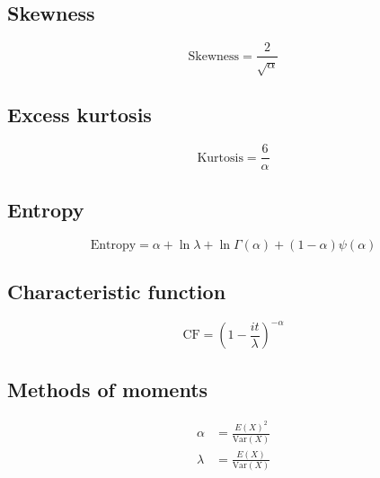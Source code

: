\documentclass[12pt]{article}
\begin{document}
\subsection{Skewness}
\begin{equation*}\label{eq:gamma-skewness-2}
	\text{Skewness} = \frac{2}{\sqrt{\alpha}}
\end{equation*}

\subsection{Excess kurtosis}
\begin{equation*}\label{eq:gamma-kurtosis-2}
	\text{Kurtosis} = \frac{6}{\alpha}
\end{equation*}

\subsection{Entropy}
\begin{equation*}\label{eq:gamma-entropy-2}
	\text{Entropy} = \alpha + \ln{\lambda} + \ln{\Gamma(\alpha)} + (1-\alpha)\psi(\alpha)
\end{equation*}

\subsection{Characteristic function}
\begin{equation*}\label{eq:gamma-cf-2}
	\text{CF} = \left(1-\frac{it}{\lambda}\right)^{-\alpha}
\end{equation*}

\subsection{Methods of moments}
\begin{equation*}\label{eq:gamma-mom-2}
	\begin{split}
		\alpha	&=	\frac{E(X)^2}{\text{Var}(X)}\\
		\lambda	&=	\frac{E(X)}{\text{Var}(X)}
	\end{split}
\end{equation*}

\end{document}
